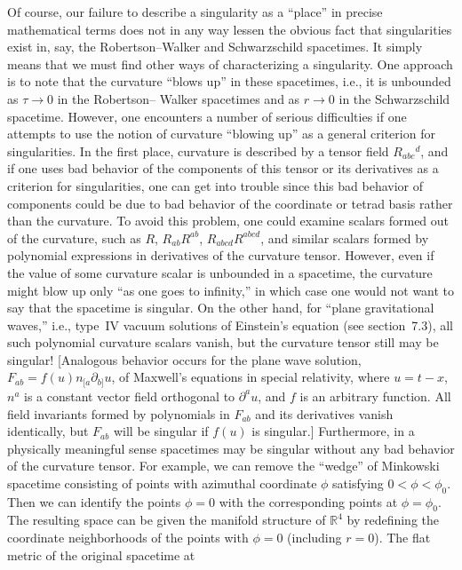 Of course, our failure to describe a singularity as a ``place'' in precise mathematical
terms does not in any way lessen the obvious fact that singularities exist in, say, the
Robertson--Walker and Schwarzschild spacetimes. It simply means that we must find
other ways of characterizing a singularity. One approach is to note that the curvature
``blows up'' in these spacetimes, i.e., it is unbounded as \(\tau\to0\) in the Robertson--
Walker spacetimes and as \(r\to0\) in the Schwarzschild spacetime. However, one
encounters a number of serious difficulties if one attempts to use the notion of
curvature ``blowing up'' as a general criterion for singularities. In the first place,
curvature is described by a tensor field \(R_{abc}{}^d\), and if one uses bad behavior of the
components of this tensor or its derivatives as a criterion for singularities, one can
get into trouble since this bad behavior of components could be due to bad behavior
of the coordinate or tetrad basis rather than the curvature. To avoid this problem, one
could examine scalars formed out of the curvature, such as \(R\), \(R_{ab}R^{ab}\),
\(R_{abcd}R^{abcd}\), and similar scalars formed by polynomial expressions in derivatives
of the curvature tensor. However, even if the value of some curvature scalar is
unbounded in a spacetime, the curvature might blow up only ``as one goes to infinity,''
in which case one would not want to say that the spacetime is singular. On the other
hand, for ``plane gravitational waves,'' i.e., type~IV vacuum solutions of Einstein's
equation (see section~7.3), all such polynomial curvature scalars vanish, but the
curvature tensor still may be singular! [Analogous behavior occurs for the plane wave
solution, \(F_{ab}=f(u)n_{[a}\partial_{b]}u\), of Maxwell's equations in special relativity,
where \(u=t-x\), \(n^a\) is a constant vector field orthogonal to \(\partial^a u\), and \(f\) is
an arbitrary function. All field invariants formed by polynomials in \(F_{ab}\) and its
derivatives vanish identically, but \(F_{ab}\) will be singular if \(f(u)\) is singular.]
Furthermore, in a physically meaningful sense spacetimes may be singular without
any bad behavior of the curvature tensor. For example, we can remove the ``wedge''
of Minkowski spacetime consisting of points with azimuthal coordinate \(\phi\)
satisfying \(0<\phi<\phi_0\). Then we can identify the points \(\phi=0\) with the
corresponding points at \(\phi=\phi_0\). The resulting space can be given the
manifold structure of \(\mathbb R^4\) by redefining the coordinate neighborhoods of the
points with \(\phi=0\) (including \(r=0\)). The flat metric of the original spacetime at
